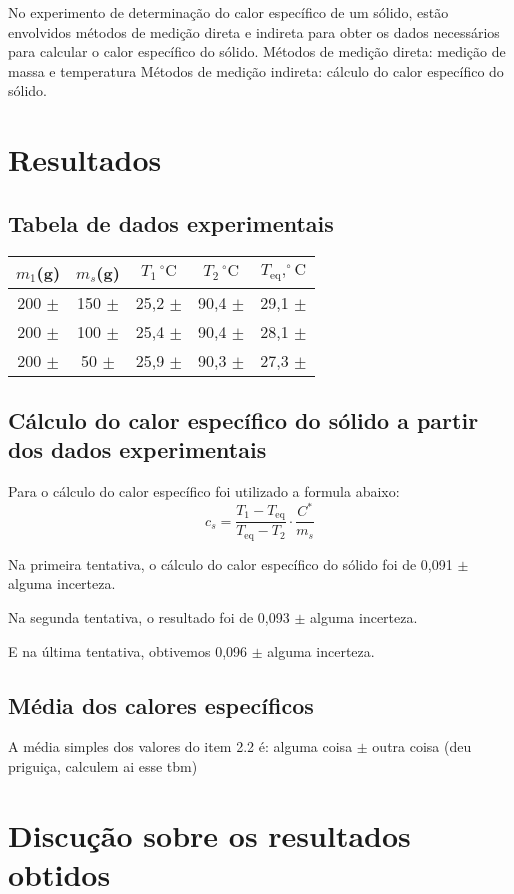 \documentclass{article}
\begin{document}
\begin{multicols}{2}
No experimento de determinação do calor específico de um sólido, estão envolvidos métodos de medição direta e indireta para obter os dados necessários para calcular o calor específico do sólido.
Métodos de medição direta: medição de massa e temperatura
Métodos de medição indireta: cálculo do calor específico do sólido.

\section{Resultados}
\subsection{Tabela de dados experimentais}

\begin{minipage}{\linewidth}
\centering
\begin{tabular}{|c|c|c|c|c|}
    \hline
    $m_1$(g) & $m_s$(g) & $T_1\,^{\circ}\mathrm{C}$    & $T_2\,^{\circ}\mathrm{C}$ &$T_{\text{eq}},^{\circ}\mathrm{C}$ \\
    \hline
    200 $\pm$ & 150 $\pm$   & 25,2 $\pm$  & 90,4 $\pm$  & 29,1 $\pm$   \\
    \hline
    200 $\pm$  & 100 $\pm$  & 25,4 $\pm$  & 90,4 $\pm$  & 28,1 $\pm$   \\
    \hline
    200 $\pm$ & 50 $\pm$   & 25,9 $\pm$  & 90,3 $\pm$  & 27,3 $\pm$    \\
    \hline
\end{tabular}
\end{minipage}

\subsection{Cálculo do calor específico do sólido a partir dos dados experimentais}
Para o cálculo do calor específico foi utilizado a formula abaixo:
\begin{equation}
    c_s = \frac{{T_1 - T_{\text{eq}}}}{{T_{\text{eq}} - T_2}} \cdot \frac{C^*}{m_s}
    \end{equation}
    
Na primeira tentativa, o cálculo do calor específico do sólido foi de 0,091 $\pm$ alguma incerteza.

Na segunda tentativa, o resultado foi de 0,093 $\pm$ alguma incerteza.

E na última tentativa, obtivemos 0,096 $\pm$ alguma incerteza.

\subsection{Média dos calores específicos}

A média simples dos valores do item 2.2 é: alguma coisa $\pm$ outra coisa (deu priguiça, calculem ai esse tbm)

\section{Discução sobre os resultados obtidos}

\end{multicols}
\end{document}
